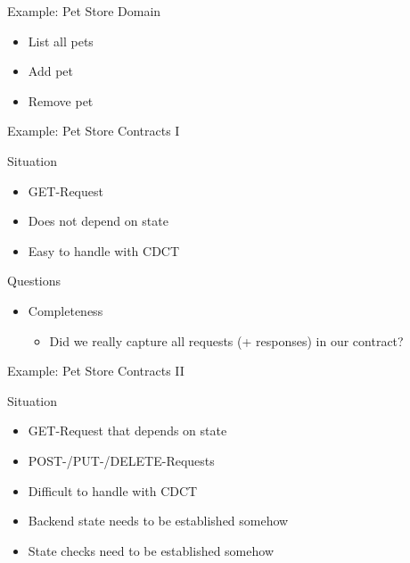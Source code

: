 \begin{frame}[fragile]{}
\end{frame}

\begin{frame}[fragile]{Example: Pet Store Domain}

\begin{itemize}
\item List all pets
\item Add pet
\item Remove pet
\end{itemize}

\end{frame}

\begin{frame}[fragile]{Example: Pet Store Contracts I}

  

\end{frame}


\begin{frame}[fragile]{Situation}

\begin{itemize}[<+->]
\item GET-Request
\item Does not depend on state
\item Easy to handle with CDCT
\end{itemize}
\end{frame}

\begin{frame}[fragile]{Questions}

\begin{itemize}[<+->]
\item Completeness
\begin{itemize}
\item Did we really capture all requests (+ responses) in our contract?
\end{itemize}
\end{itemize}

\end{frame}


\begin{frame}[fragile]{Example: Pet Store Contracts II}

  

\end{frame}


\begin{frame}[fragile]{Situation}

\begin{itemize}[<+->]
\item GET-Request that depends on state
\item POST-/PUT-/DELETE-Requests
\item Difficult to handle with CDCT
\item Backend state needs to be established somehow
\item State checks need to be established somehow
\end{itemize}
\end{frame}


